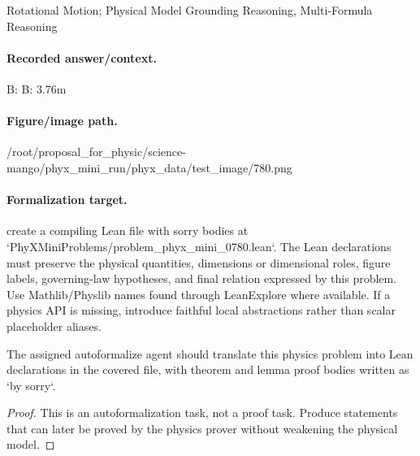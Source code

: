 Rotational Motion; Physical Model Grounding Reasoning, Multi-Formula Reasoning

\paragraph{Recorded answer/context.}
B: B: 3.76m

\paragraph{Figure/image path.}
/root/proposal\_for\_physic/science-mango/phyx\_mini\_run/phyx\_data/test\_image/780.png

\paragraph{Formalization target.}
create a compiling Lean file with sorry bodies at `PhyXMiniProblems/problem\_phyx\_mini\_0780.lean`. The Lean declarations must preserve the physical quantities, dimensions or dimensional roles, figure labels, governing-law hypotheses, and final relation expressed by this problem.
Use Mathlib/Physlib names found through LeanExplore where available. If a physics API is missing, introduce faithful local abstractions rather than scalar placeholder aliases.

\begin{theorem}
\label{thm:physics:phyx_mini_0780:target}
The assigned autoformalize agent should translate this physics problem into Lean declarations in the covered file, with theorem and lemma proof bodies written as `by sorry`.
\end{theorem}
\begin{proof}
This is an autoformalization task, not a proof task. Produce statements that can later be proved by the physics prover without weakening the physical model.
\end{proof}

